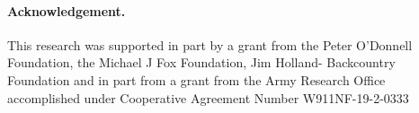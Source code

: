 \documentclass{article}
\theoremstyle{definition}
\begin{document}
\paragraph{Acknowledgement.} This research was supported in part by a grant from the Peter O’Donnell Foundation, the Michael J Fox Foundation, Jim Holland- Backcountry Foundation and in part from a grant from the Army Research Office accomplished under Cooperative Agreement Number W911NF-19-2-0333






\newpage
\appendix

\end{document}
